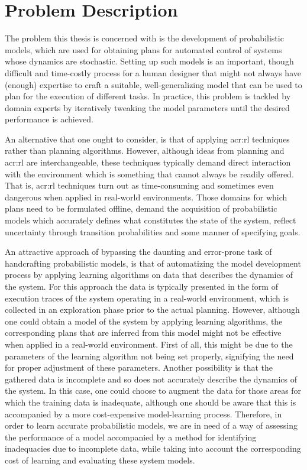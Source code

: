 \section{Problem Description}
\label{sec:problem-description}

The problem this thesis is concerned with is the development of probabilistic models, which are used for obtaining plans for automated control of systems whose dynamics are stochastic.
Setting up such models is an important, though difficult and time-costly process for a human designer that might not always have (enough) expertise to craft a suitable, well-generalizing model that can be used to plan for the execution of different tasks.
In practice, this problem is tackled by domain experts by iteratively tweaking the model parameters until the desired performance is achieved.

An alternative that one ought to consider, is that of applying \acrshort{acr:rl} techniques rather than planning algorithms.
However, although ideas from planning and \acrshort{acr:rl} are interchangeable, these techniques typically demand direct interaction with the environment which is something that cannot always be readily offered.
That is, \acrshort{acr:rl} techniques turn out as time-consuming and sometimes even dangerous when applied in real-world environments.
Those domains for which plans need to be formulated offline, demand the acquisition of probabilistic models which accurately defines what constitutes the state of the system, reflect uncertainty through transition probabilities and some manner of specifying goals.

An attractive approach of bypassing the daunting and error-prone task of handcrafting probabilistic models, is that of automatizing the model development process by applying learning algorithms on data that describes the dynamics of the system.
For this approach the data is typically presented in the form of execution traces of the system operating in a real-world environment, which is collected in an exploration phase prior to the actual planning.
However, although one could obtain a model of the system by applying learning algorithms, the corresponding plans that are inferred from this model might not be effective when applied in a real-world environment.
First of all, this might be due to the parameters of the learning algorithm not being set properly, signifying the need for proper adjustment of these parameters.
Another possibility is that the gathered data is incomplete and so does not accurately describe the dynamics of the system.
In this case, one could choose to augment the data for those areas for which the training data is inadequate, although one should be aware that this is accompanied by a more cost-expensive model-learning process.
Therefore, in order to learn accurate probabilistic models, we are in need of a way of assessing the performance of a model accompanied by a method for identifying inadequacies due to incomplete data, while taking into account the corresponding cost of learning and evaluating these system models.

